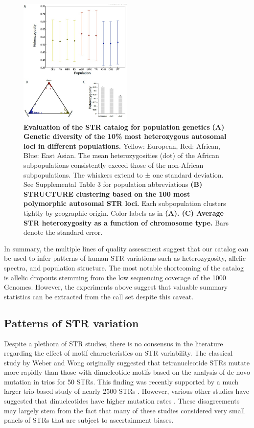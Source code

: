 \begin{figure}[h!]
\centering
\label{fig:catfig3}
\includegraphics[width=0.5\textwidth]{Figures/Chapter3/Fig3.jpg}
\caption{\textbf{Evaluation of the STR catalog for population genetics} \textbf{(A) Genetic diversity of the 10\% most heterozygous autosomal loci in different populations.} Yellow: European, Red: African, Blue: East Asian. The mean heterozygosities (dot) of the African subpopulations consistently exceed those of the non-African subpopulations. The whiskers extend to ± one standard deviation. See Supplemental Table 3 for population abbreviations \textbf{(B) STRUCTURE clustering based on the 100 most polymorphic autosomal STR loci.} Each subpopulation clusters tightly by geographic origin. Color labels as in \textbf{(A). (C) Average STR heterozygosity as a function of chromosome type.} Bars denote the standard error.}
\end{figure}

In summary, the multiple lines of quality assessment suggest that our catalog can be used to infer patterns of human STR variations such as heterozygosity, allelic spectra, and population structure. The most notable shortcoming of the catalog is allelic dropouts stemming from the low sequencing coverage of the 1000 Genomes. However, the experiments above suggest that valuable summary statistics can be extracted from the call set despite this caveat. 

\subsection{Patterns of STR variation}
Despite a plethora of STR studies, there is no consensus in the literature regarding the effect of motif characteristics on STR variability. The classical study by Weber and Wong \cite{WeberWong1993} originally suggested that tetranucleotide STRs mutate more rapidly than those with dinucleotide motifs based on the analysis of de-novo mutation in trios for 50 STRs. This finding was recently supported by a much larger trio-based study of nearly 2500 STRs \cite{SunHelgasonMassonEtAl2012}. However, various other studies have suggested that dinucleotides have higher mutation rates \cite{ChakrabortyKimmelStiversEtAl1997,PembertonSandefurJakobssonEtAl2009}. These disagreements may largely stem from the fact that many of these studies considered very small panels of STRs that are subject to ascertainment biases. 

